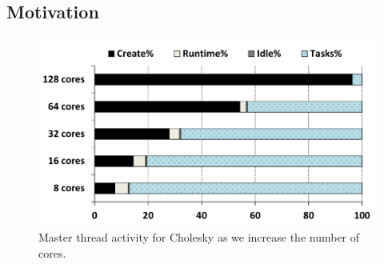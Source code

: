\subsection{Motivation}

\begin{figure}[t!]%
	\centering
	\includegraphics[width=1.0\columnwidth]{figures/master_thread.pdf}
	\caption{Master thread activity for Cholesky as we increase the number of cores.}
	\label{fig:master_thread}%
\end{figure}

